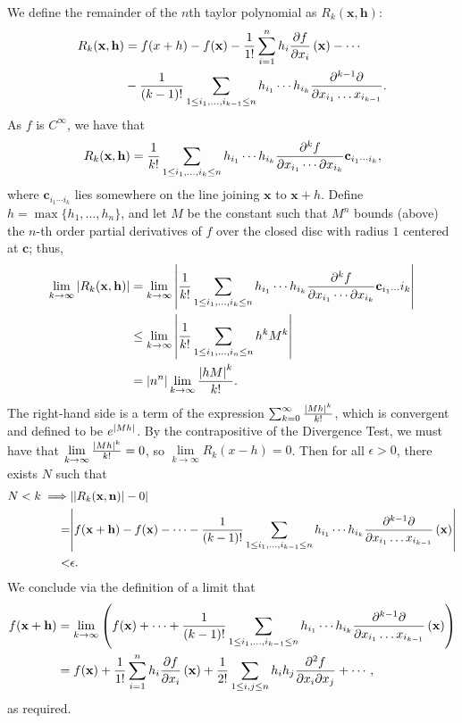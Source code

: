 \documentclass[11pt]{article}
\renewcommand{\vec}[1]{\mathbf{#1}}
\begin{document}
We define the remainder of the $n$th taylor polynomial as $R_{k}(\vec{x}, \vec{h})$:
\begin{align*}
	R_{k}(\vec{x}, \vec{h}) &= f(x + h) - f(\vec{x}) - \frac{1}{1!} \sum_{i = 1}^{n}h_{i} \pdv{f}{x_{i}} \left( \vec{x} \right) - \cdots \\ 
	&- \frac{1}{(k - 1)!} \sum_{1 \le i_{1}, \ldots, i_{k - 1} \le n} h_{i_{1}} \cdots h_{i_{k}} \pdv{^{k - 1}\partial }{x_{i_{1}} \ldots x_{i_{k - 1}}} (\vec{x}).
\end{align*}
As $f$ is $C^{\infty}$, we have that 
\[
	R_{k}(\vec{x}, \vec{h}) = \frac{1}{k!} \sum_{1 \le i_{1}, \ldots, i_{k} \le n} h_{i_{1}} \cdots h_{i_{k}} \pdv{^{k} f}{x_{i_{1}} \cdots \partial x_{i_{k}}} \vec{c}_{i_{1} \cdots i_{k}},
\]
where $\vec{c}_{i_{1} \cdots i_{k}}$ lies somewhere on the line joining $\vec{x}$ to $\vec{x} + h$. Define $h = \max\{h_{1}, \ldots, h_{n}\}$, and let $M$ be the constant such that $M^{n}$ bounds (above) the $n$-th order partial derivatives of $f$ over the closed disc with radius $1$ centered at $\vec{c}$; thus,
\begin{align*}
	\lim\limits_{k \to \infty} \abs{R_{k}(\vec{x}, \vec{h})} &= \lim\limits_{k \to \infty} \abs{\frac{1}{k!} \sum_{1 \le i_{1}, \ldots, i_{k} \le n} h_{i_{1}} \cdots h_{i_{k}} \pdv{^{k} f}{x_{i_{1}} \cdots \partial x_{i_{k}}} \vec{c}_{i_{1} \cdots} i_{k}} \\
	&\le \lim\limits_{k \to \infty} \abs{\frac{1}{k!} \sum_{1 \le i_{1}, \ldots, i_{n} \le n} h^{k} M^{k}} \\
	&= \abs{n^{n}} \lim\limits_{k \to \infty} \frac{\abs{hM}^{k}}{k!}.
\end{align*}
The right-hand side is a term of the expression $\sum_{k = 0}^{\infty} \frac{\abs{Mh}^{k}}{k!}$, which is convergent and defined to be $e^{\abs{Mh}}$. By the contrapositive of the Divergence Test, we must have that $\lim\limits_{k \to \infty} \frac{\abs{Mh}^{k}}{k!} = 0$, so $\lim\limits_{k \to \infty} R_{k}(x - h) = 0$. Then for all $\epsilon > 0$, there exists $N$ such that 
\begin{align*}
	N < k \implies& \abs{\abs{R_{k}(\vec{x}, \vec{n})} - 0} \\
	=& \abs{f(\vec{x} + \vec{h}) - f(\vec{x}) - \cdots - \frac{1}{(k - 1)!} \sum_{1 \le i_{1}, \ldots, i_{k - 1} \le n} h_{i_{1}} \cdots h_{i_{k}} \pdv{^{k - 1}\partial }{x_{i_{1}} \ldots x_{i_{k - 1}}} \left(\vec{x}\right)} \\
	<& \epsilon.
\end{align*}
We conclude via the definition of a limit that
\begin{align*}
	f(\vec{x} + \vec{h}) &= \lim\limits_{k \to \infty} \left( f(\vec{x}) + \cdots + \frac{1}{(k - 1)!} \sum_{1 \le i_{1}, \ldots, i_{k - 1} \le n} h_{i_{1}} \cdots h_{i_{k}} \pdv{^{k - 1}\partial }{x_{i_{1}} \ldots x_{i_{k - 1}}} \left(\vec{x}\right) \right) \\
	&= f(\vec{x}) + \frac{1}{1!} \sum_{i = 1}^{n}h_{i} \pdv{f}{x_{i}} \left( \vec{x} \right) + \frac{1}{2!} \sum_{1 \le i, j \le n} h_{i}h_{j} \pdv[2]{f}{x_{i}}{x_{j}} (\vec{x}) + \cdots,
\end{align*}
as required.
\end{document}
